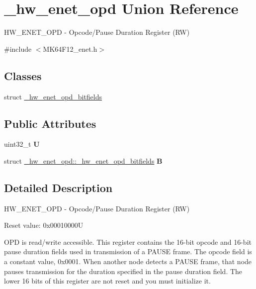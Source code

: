 \hypertarget{union__hw__enet__opd}{}\section{\+\_\+hw\+\_\+enet\+\_\+opd Union Reference}
\label{union__hw__enet__opd}


H\+W\+\_\+\+E\+N\+E\+T\+\_\+\+O\+PD -\/ Opcode/\+Pause Duration Register (RW)  




{\ttfamily \#include $<$M\+K64\+F12\+\_\+enet.\+h$>$}

\subsection*{Classes}
\begin{DoxyCompactItemize}
\item 
struct \hyperlink{struct__hw__enet__opd_1_1__hw__enet__opd__bitfields}{\+\_\+hw\+\_\+enet\+\_\+opd\+\_\+bitfields}
\end{DoxyCompactItemize}
\subsection*{Public Attributes}
\begin{DoxyCompactItemize}
\item 
uint32\+\_\+t {\bfseries U}\hypertarget{union__hw__enet__opd_a9326c8d16f8bc2080e3380fbb444f265}{}\label{union__hw__enet__opd_a9326c8d16f8bc2080e3380fbb444f265}

\item 
struct \hyperlink{struct__hw__enet__opd_1_1__hw__enet__opd__bitfields}{\+\_\+hw\+\_\+enet\+\_\+opd\+::\+\_\+hw\+\_\+enet\+\_\+opd\+\_\+bitfields} {\bfseries B}\hypertarget{union__hw__enet__opd_aa9d367723ac0b4525af664f48b532321}{}\label{union__hw__enet__opd_aa9d367723ac0b4525af664f48b532321}

\end{DoxyCompactItemize}


\subsection{Detailed Description}
H\+W\+\_\+\+E\+N\+E\+T\+\_\+\+O\+PD -\/ Opcode/\+Pause Duration Register (RW) 

Reset value\+: 0x00010000U

O\+PD is read/write accessible. This register contains the 16-\/bit opcode and 16-\/bit pause duration fields used in transmission of a P\+A\+U\+SE frame. The opcode field is a constant value, 0x0001. When another node detects a P\+A\+U\+SE frame, that node pauses transmission for the duration specified in the pause duration field. The lower 16 bits of this register are not reset and you must initialize it. 

